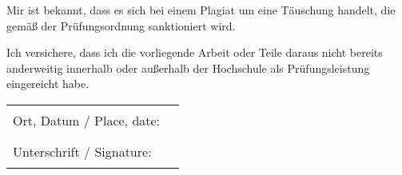 \vspace{1.5em}

\noindent
Mir ist bekannt, dass es sich bei einem Plagiat um eine Täuschung handelt, die gemäß der Prüfungsordnung sanktioniert wird. \\

\vspace{1.5em}

\noindent
Ich versichere, dass ich die vorliegende Arbeit oder Teile daraus nicht bereits anderweitig innerhalb oder außerhalb der Hochschule als Prüfungsleistung eingereicht habe. \\

\vspace{2em}

\noindent
\begin{tabular}{ll}
  Ort, Datum / Place, date: & \rule{7cm}{0.4pt} \\
  Unterschrift / Signature: & \rule{7cm}{0.4pt}
\end{tabular}